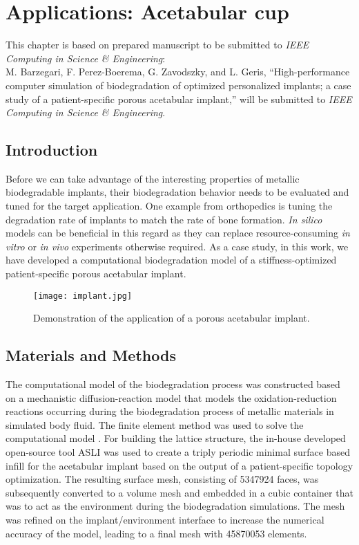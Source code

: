 \chapter{Applications: Acetabular cup}\label{ch:cup}

\begin{shaded}
This chapter is based on prepared manuscript to be submitted to  \textit{IEEE Computing in Science \& Engineering}:\\
M. Barzegari, F. Perez-Boerema, G. Zavodszky, and L. Geris, ``High-performance computer simulation of biodegradation of optimized personalized implants; a case study of a patient-specific porous acetabular implant,'' will be submitted to \textit{IEEE Computing in Science \& Engineering}.
\end{shaded}

\section{Introduction}

Before we can take advantage of the interesting properties of metallic biodegradable implants, their biodegradation behavior needs to be evaluated and tuned for the target application. One example from orthopedics is tuning the degradation rate of implants to match the rate of bone formation. \textit{In silico} models can be beneficial in this regard as they can replace resource-consuming \textit{in vitro} or \textit{in vivo }experiments otherwise required. As a case study, in this work, we have developed a computational biodegradation model of a stiffness-optimized patient-specific porous acetabular implant.


\begin{figure}[h]
\centering
\medskip
\texttt{[image: implant.jpg]}
\caption[Application of the acetabular implant]{Demonstration of the application of a porous acetabular implant.} \label{fig:cup_implant}
\end{figure}

\section{Materials and Methods}

The computational model of the biodegradation process was constructed based on a mechanistic diffusion-reaction model that models the oxidation-reduction reactions occurring during the biodegradation process of metallic materials in simulated body fluid. The finite element method was used to solve the computational model \cite{Barzegari2021}. For building the lattice structure, the in-house developed open-source tool ASLI \cite{Perez-Boerema2022} was used to create a triply periodic minimal surface based infill for the acetabular implant based on the output of a patient-specific topology optimization. The resulting surface mesh, consisting of \num{5347924} faces, was subsequently converted to a volume mesh and embedded in a cubic container that was to act as the environment during the biodegradation simulations. The mesh was refined on the implant/environment interface to increase the numerical accuracy of the model, leading to a final mesh with \num{45870053} elements.

